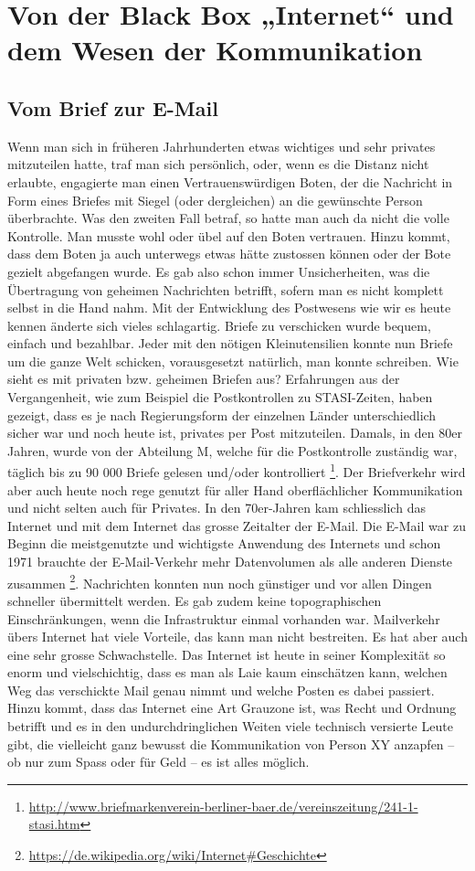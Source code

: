 \section{Von der Black Box „Internet“ und dem Wesen der Kommunikation}
\subsection{Vom Brief zur E-Mail}
Wenn man sich in früheren Jahrhunderten etwas wichtiges und sehr privates mitzuteilen hatte, traf man sich persönlich, oder, wenn es die Distanz nicht erlaubte, engagierte man einen Vertrauenswürdigen Boten, der die Nachricht in Form eines Briefes mit Siegel (oder dergleichen) an die gewünschte Person überbrachte. Was den zweiten Fall betraf, so hatte man auch da nicht die volle Kontrolle. Man musste wohl oder übel auf den Boten vertrauen. Hinzu kommt, dass dem Boten ja auch unterwegs etwas hätte zustossen können oder der Bote gezielt abgefangen wurde. Es gab also schon immer Unsicherheiten, was die Übertragung von geheimen Nachrichten betrifft, sofern man es nicht komplett selbst in die Hand nahm. Mit der Entwicklung des Postwesens wie wir es heute kennen änderte sich vieles schlagartig. Briefe zu verschicken wurde bequem, einfach und bezahlbar. Jeder mit den nötigen Kleinutensilien konnte nun Briefe um die ganze Welt schicken, vorausgesetzt natürlich, man konnte schreiben. Wie sieht es mit privaten bzw. geheimen Briefen aus? Erfahrungen aus der Vergangenheit, wie zum Beispiel die Postkontrollen zu STASI-Zeiten, haben gezeigt, dass es je nach Regierungsform der einzelnen Länder unterschiedlich sicher war und noch heute ist, privates per Post mitzuteilen. Damals, in den 80er Jahren, wurde von der Abteilung M, welche für die Postkontrolle zuständig war, täglich bis zu 90 000 Briefe gelesen und/oder kontrolliert
\footnote{\url{http://www.briefmarkenverein-berliner-baer.de/vereinszeitung/241-1-stasi.htm}}. 
Der Briefverkehr wird aber auch heute noch rege genutzt für aller Hand oberflächlicher Kommunikation und nicht selten auch für Privates. In den 70er-Jahren kam schliesslich das Internet und mit dem Internet das grosse Zeitalter der E-Mail. Die E-Mail war zu Beginn die meistgenutzte und wichtigste Anwendung des Internets und schon 1971 brauchte der E-Mail-Verkehr mehr Datenvolumen als alle anderen Dienste zusammen
\footnote{\url{https://de.wikipedia.org/wiki/Internet\#Geschichte}}. 
Nachrichten konnten nun noch günstiger und vor allen Dingen schneller übermittelt werden. Es gab zudem keine topographischen Einschränkungen, wenn die Infrastruktur einmal vorhanden war. Mailverkehr übers Internet hat viele Vorteile, das kann man nicht bestreiten. Es hat aber auch eine sehr grosse Schwachstelle. Das Internet ist heute in seiner Komplexität so enorm und vielschichtig, dass es man als Laie kaum einschätzen kann, welchen Weg das verschickte Mail genau nimmt und welche Posten es dabei passiert. Hinzu kommt, dass das Internet eine Art Grauzone ist, was Recht und Ordnung betrifft und es in den undurchdringlichen Weiten viele technisch versierte Leute gibt, die vielleicht ganz bewusst die Kommunikation von Person XY anzapfen – ob nur zum Spass oder für Geld – es ist alles möglich.

